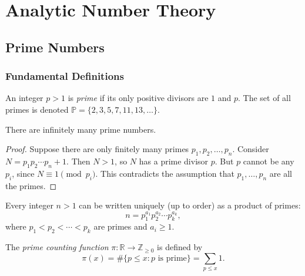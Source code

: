 \part{Analytic Number Theory}

\chapter{Prime Numbers}

\section{Fundamental Definitions}

\begin{definition}
  An integer $p > 1$ is \emph{prime} if its only positive divisors are $1$ and $p$. The set of all primes is denoted $\mathbb{P} = \{2, 3, 5, 7, 11, 13, \ldots\}$.
\end{definition}

\begin{theorem}
  There are infinitely many prime numbers.
\end{theorem}

\begin{proof}
  Suppose there are only finitely many primes $p_1, p_2, \ldots, p_n$. Consider $N = p_1 p_2 \cdots p_n + 1$. Then $N > 1$, so $N$ has a prime divisor $p$. But $p$ cannot be any $p_i$, since $N \equiv 1 \pmod{p_i}$. This contradicts the assumption that $p_1, \ldots, p_n$ are all the primes.
\end{proof}

\begin{theorem}
  Every integer $n > 1$ can be written uniquely (up to order) as a product of primes:
  \begin{equation}
    n = p_1^{a_1} p_2^{a_2} \cdots p_k^{a_k},
  \end{equation}
  where $p_1 < p_2 < \cdots < p_k$ are primes and $a_i \geq 1$.
\end{theorem}

\begin{definition}
  The \emph{prime counting function} $\pi : \mathbb{R} \to \mathbb{Z}_{\geq 0}$ is defined by
  \begin{equation}
    \pi(x) = \#\{p \leq x : p \text{ is prime}\} = \sum_{p \leq x} 1.
  \end{equation}
\end{definition}

